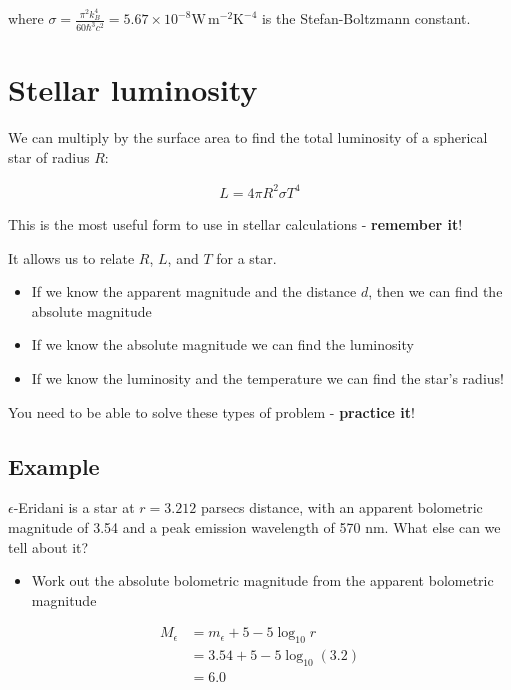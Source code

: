 \documentclass[
  letterpaper,
  DIV=11,
  numbers=noendperiod]{scrreprt}
\providecommand{\tightlist}{%
  \setlength{\itemsep}{0pt}\setlength{\parskip}{0pt}}\usepackage{longtable,booktabs,array}
\begin{document}
where
\(\sigma = \frac{\pi^2 k_B^4 }{60 \hbar^3 c^2} = 5.67\times 10^{-8}\mathrm{W\,m^{-2}K^{-4}}\)
is the Stefan-Boltzmann constant.


\hypertarget{stellar-luminosity}{%
\chapter{Stellar luminosity}\label{stellar-luminosity}}

We can multiply by the surface area to find the total luminosity of a
spherical star of radius \(R\):

\begin{align}
L = 4\pi R^2 \sigma T^4
\end{align}

This is the most useful form to use in stellar calculations -
\textbf{remember it}!

It allows us to relate \(R\), \(L\), and \(T\) for a star.

\begin{itemize}
\tightlist
\item
  If we know the apparent magnitude and the distance \(d\), then we can
  find the absolute magnitude
\item
  If we know the absolute magnitude we can find the luminosity
\item
  If we know the luminosity and the temperature we can find the star's
  radius!
\end{itemize}

You need to be able to solve these types of problem - \textbf{practice
it}!

\hypertarget{example-3}{%
\section{Example}\label{example-3}}

\(\epsilon\)-Eridani is a star at \(r=3.212\) parsecs distance, with an
apparent bolometric magnitude of 3.54 and a peak emission wavelength of
570 nm. What else can we tell about it?

\begin{itemize}
\tightlist
\item
  Work out the absolute bolometric magnitude from the apparent
  bolometric magnitude
\end{itemize}

\begin{align}
M_\epsilon &= m_\epsilon + 5 - 5\log_{10}r \\
  &= 3.54 + 5 - 5\log_{10}(3.2) \\
  &= 6.0
\end{align}
\end{document}
